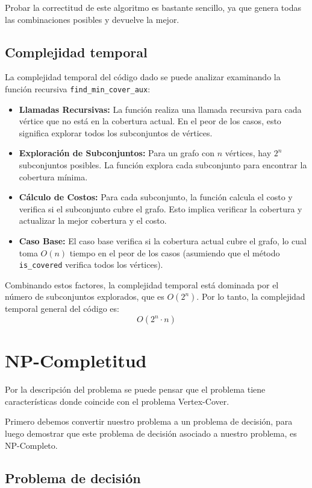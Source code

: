 \documentclass{article}
\begin{document}
Probar la correctitud de este algoritmo es bastante sencillo, ya que genera todas las combinaciones posibles y devuelve la mejor.

\subsection*{Complejidad temporal}

La complejidad temporal del código dado se puede analizar examinando la función recursiva \texttt{find\_min\_cover\_aux}:

\begin{itemize}
  \item \textbf{Llamadas Recursivas:} La función realiza una llamada recursiva para cada vértice que no está en la cobertura actual. En el peor de los casos, esto significa explorar todos los subconjuntos de vértices.
  \item \textbf{Exploración de Subconjuntos:} Para un grafo con $n$ vértices, hay $2^n$ subconjuntos posibles. La función explora cada subconjunto para encontrar la cobertura mínima.
  \item \textbf{Cálculo de Costos:} Para cada subconjunto, la función calcula el costo y verifica si el subconjunto cubre el grafo. Esto implica verificar la cobertura y actualizar la mejor cobertura y el costo.
  \item \textbf{Caso Base:} El caso base verifica si la cobertura actual cubre el grafo, lo cual toma $O(n)$ tiempo en el peor de los casos (asumiendo que el método \texttt{is\_covered} verifica todos los vértices).
\end{itemize}

Combinando estos factores, la complejidad temporal está dominada por el número de subconjuntos explorados, que es $O(2^n)$. Por lo tanto, la complejidad temporal general del código es:
\[ O(2^n \cdot n) \]

\section*{NP-Completitud}

Por la descripción del problema se puede pensar que el problema tiene características donde coincide con el problema Vertex-Cover.

Primero debemos convertir nuestro problema a un problema de decisión, para luego demostrar que este problema de decisión asociado a nuestro problema, es NP-Completo.

\subsection*{Problema de decisión}
\end{document}
